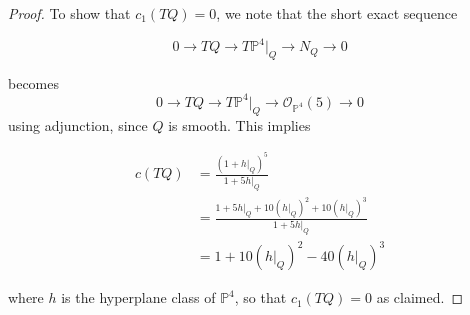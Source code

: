 \documentclass[10pt,a4paper]{amsart}
\newcommand{\PP}{\mathbb{P}}\newcommand{\A}{\mathbb{A}}\newcommand{\Z}{\mathbb{Z}}\newcommand{\C}{\mathbb{C}}\newcommand{\N}{\mathbb{N}}\newcommand{\T}{\mathbb{T}}
\begin{document}
\begin{proof} 
To show that $c_1(TQ)=0$, we note that the short exact sequence

\[ 0 \rightarrow TQ \rightarrow T\PP^4\bigg|_Q \rightarrow N_Q \rightarrow 0 \] 

becomes \[ 0 \rightarrow TQ \rightarrow T\PP^4\bigg|_Q \rightarrow \mathcal{O}_{\PP^4}(5) \rightarrow 0 \] using adjunction, since $Q$ is smooth. This implies

\begin{align*}
    c(TQ) &= \frac{(1+h\bigg|_Q)^5}{1+5h\bigg|_Q}\\
    &= \frac{1 + 5h\bigg|_Q + 10 (h\bigg|_Q)^2 + 10 (h\bigg|_Q)^3 }{1 + 5h\bigg|_Q}\\
    &= 1 + 10(h\bigg|_Q)^2 - 40 (h\bigg|_Q)^3
\end{align*}

where $h$ is the hyperplane class of $\PP^4$, so that $c_1(TQ)=0$ as claimed. \end{proof} 
\end{document}
